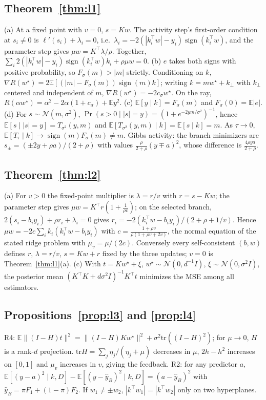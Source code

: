 \documentclass{article}
\theoremstyle{definition}
\theoremstyle{remark}
\newcommand{\Fsig}{F_{\sigma}}
\newcommand{\sgnx}{\operatorname{sign}}
\newcommand{\Ex}{\mathbb{E}}
\begin{document}
\subsection{Theorem~\ref{thm:l1}}
(a) At a fixed point with $v=0$, $s=Kw$. The activity step's first-order condition at $s_i\neq0$ is $\ell'(s_i)+\lambda_i=0$, i.e.\ $\lambda_i=-2(|k_i^\top w|-y_i)\sgnx(k_i^\top w)$, and the parameter step gives $\mu w=K^\top\lambda/\rho$. Together, $\sum_i2(|k_i^\top w|-y_i)\sgnx(k_i^\top w)k_i+\rho\mu w=0$.
(b) $e$ takes both signs with positive probability, so $\Fsig(m)>|m|$ strictly. Conditioning on $k$, $\nabla R(w^\star)=2\Ex[(|m|-\Fsig(m))\sgnx(m)k]$; writing $k=mw^\star+k_\perp$ with $k_\perp$ centered and independent of $m$, $\nabla R(w^\star)=-2c_\sigma w^\star$. On the ray, $R(\alpha w^\star)=\alpha^2-2\alpha(1+c_\sigma)+\Ex y^2$.
(c) $\Ex[y\mid k]=\Fsig(m)$ and $\Fsig(0)=\Ex|e|$.
(d) For $s\sim\mathcal N(m,\sigma^2)$, $\Pr(s>0\mid|s|=y)=(1+e^{-2ym/\sigma^2})^{-1}$, hence $\Ex[s\mid|s|=y]=T_{\sigma^2}(y,m)$ and $\Ex[T_{\sigma^2}(y,m)\mid k]=\Ex[s\mid k]=m$. As $\tau\to0$, $\Ex[T_\tau\mid k]\to\sgnx(m)\Fsig(m)\neq m$.
Gibbs activity: the branch minimizers are $s_\pm=(\pm2y+\rho a)/(2+\rho)$ with values $\tfrac{\rho}{2+\rho}(y\mp a)^2$, whose difference is $\tfrac{4\rho ya}{2+\rho}$.

\subsection{Theorem~\ref{thm:l2}}
(a) For $v>0$ the fixed-point multiplier is $\lambda=r/v$ with $r=s-Kw$; the parameter step gives $\mu w=K^\top r(1+\tfrac{1}{\rho v})$; on the selected branch, $2(s_i-b_iy_i)+\rho r_i+\lambda_i=0$ gives $r_i=-2(k_i^\top w-b_iy_i)/(2+\rho+1/v)$. Hence $\mu w=-2c\sum_ik_i(k_i^\top w-b_iy_i)$ with $c=\tfrac{1+\rho v}{\rho(1+\rho v+2v)}$, the normal equation of the stated ridge problem with $\mu_v=\mu/(2c)$. Conversely every self-consistent $(b,w)$ defines $r$, $\lambda=r/v$, $s=Kw+r$ fixed by the three updates; $v=0$ is Theorem~\ref{thm:l1}(a).
(c) With $t=Kw^\star+\xi$, $w^\star\sim\mathcal N(0,d^{-1}I)$, $\xi\sim\mathcal N(0,\sigma^2I)$, the posterior mean $(K^\top K+d\sigma^2I)^{-1}K^\top t$ minimizes the MSE among all estimators.

\subsection{Propositions~\ref{prop:l3} and \ref{prop:l4}}
R4: $\Ex\|(I-H)t\|^2=\|(I-H)Kw^\star\|^2+\sigma^2\mathrm{tr}((I-H)^2)$; for $\mu\to0$, $H$ is a rank-$d$ projection. $\mathrm{tr}H=\sum_j\eta_j/(\eta_j+\mu)$ decreases in $\mu$, $2h-h^2$ increases on $[0,1]$ and $\mu_v$ increases in $v$, giving the feedback.
R2: for any predictor $a$, $\Ex[(y-a)^2\mid k,D]-\Ex[(y-\hat y_B)^2\mid k,D]=(a-\hat y_B)^2$ with $\hat y_B=\pi F_1+(1-\pi)F_2$. If $w_1\neq\pm w_2$, $|k^\top w_1|=|k^\top w_2|$ only on two hyperplanes.
\end{document}
